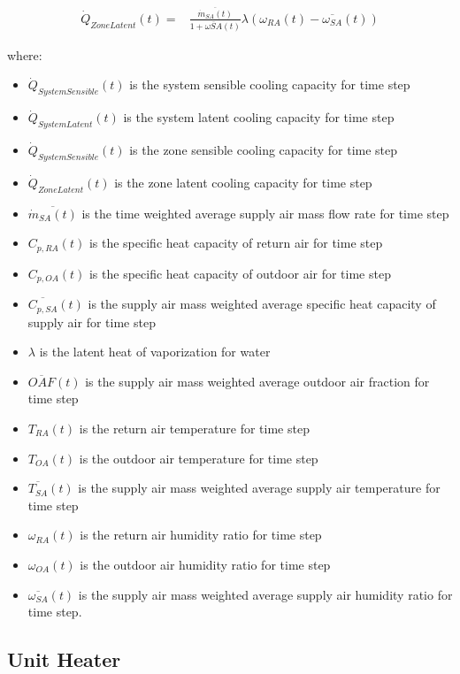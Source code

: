 \begin{align}
	\dot{Q}_{ZoneLatent}(t) = & \frac{\overline{\dot{m}_{SA}(t)}}{1+\overline{\omega{SA}}(t)}\lambda\left(\omega_{RA}(t)-\overline{\omega_{SA}}(t)\right)
\end{align}

where:
\begin{itemize}
\item $\dot{Q}_{SystemSensible}(t)$ is the system sensible cooling capacity for time step
\item $\dot{Q}_{SystemLatent}(t)$ is the system latent cooling capacity for time step
\item $\dot{Q}_{SystemSensible}(t)$ is the zone sensible cooling capacity for time step
\item $\dot{Q}_{ZoneLatent}(t)$ is the zone latent cooling capacity for time step
\item $\overline{\dot{m}_{SA}(t)}$ is the time weighted average supply air mass flow rate for time step
\item $C_{p,RA}(t)$ is the specific heat capacity of return air for time step
\item $C_{p,OA}(t)$ is the specific heat capacity of outdoor air for time step
\item $\overline{C_{p,SA}}(t)$ is the supply air mass weighted average specific heat capacity of supply air for time step
\item $\lambda$ is the latent heat of vaporization for water
\item $\overline{OAF}(t)$ is the supply air mass weighted average outdoor air fraction for time step
\item $T_{RA}(t)$ is the return air temperature for time step
\item $T_{OA}(t)$ is the outdoor air temperature for time step
\item $\overline{T_{SA}}(t)$ is the supply air mass weighted average supply air temperature for time step
\item $\omega_{RA}(t)$ is the return air humidity ratio for time step
\item $\omega_{OA}(t)$ is the outdoor air humidity ratio for time step
\item $\overline{\omega_{SA}}(t)$ is the supply air mass weighted average supply air humidity ratio for time step.
\end{itemize}

\subsection{Unit Heater}\label{unit-heater}

